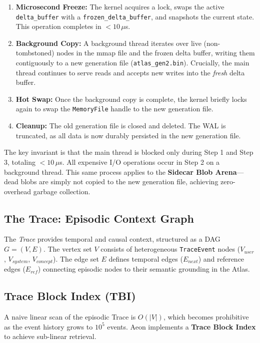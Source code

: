 \documentclass[10pt,twocolumn]{article}
\begin{document}
\begin{enumerate}
    \item \textbf{Microsecond Freeze:} The kernel acquires a lock, swaps the active \texttt{delta\_buffer} with a \texttt{frozen\_delta\_buffer}, and snapshots the current state. This operation completes in $<10\,\mu$s.
    \item \textbf{Background Copy:} A background thread iterates over live (non-tombstoned) nodes in the mmap file and the frozen delta buffer, writing them contiguously to a new generation file (\texttt{atlas\_gen2.bin}). Crucially, the main thread continues to serve reads and accepts new writes into the \textit{fresh} delta buffer.
    \item \textbf{Hot Swap:} Once the background copy is complete, the kernel briefly locks again to swap the \texttt{MemoryFile} handle to the new generation file.
    \item \textbf{Cleanup:} The old generation file is closed and deleted. The WAL is truncated, as all data is now durably persisted in the new generation file.
\end{enumerate}

The key invariant is that the main thread is blocked only during Step 1 and Step 3, totaling $<10\,\mu$s. All expensive I/O operations occur in Step 2 on a background thread. This same process applies to the \textbf{Sidecar Blob Arena}---dead blobs are simply not copied to the new generation file, achieving zero-overhead garbage collection.

\subsection{The Trace: Episodic Context Graph}
The \textit{Trace} provides temporal and causal context, structured as a DAG $G = (V, E)$. The vertex set $V$ consists of heterogeneous \texttt{TraceEvent} nodes ($V_{user}$, $V_{system}$, $V_{concept}$). The edge set $E$ defines temporal edges ($E_{next}$) and reference edges ($E_{ref}$) connecting episodic nodes to their semantic grounding in the Atlas.

\subsection{Trace Block Index (TBI)}
\label{subsec:tbi}
A naive linear scan of the episodic Trace is $O(|V|)$, which becomes prohibitive as the event history grows to $10^5$ events. Aeon implements a \textbf{Trace Block Index} to achieve sub-linear retrieval.
\end{document}
